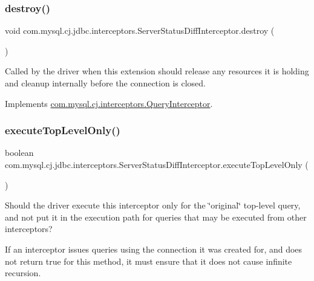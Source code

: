 \subsubsection{\texorpdfstring{destroy()}{destroy()}}
{\footnotesize\ttfamily void com.\+mysql.\+cj.\+jdbc.\+interceptors.\+Server\+Status\+Diff\+Interceptor.\+destroy (\begin{DoxyParamCaption}{ }\end{DoxyParamCaption})}

Called by the driver when this extension should release any resources it is holding and cleanup internally before the connection is closed. 

Implements \mbox{\hyperlink{interfacecom_1_1mysql_1_1cj_1_1interceptors_1_1_query_interceptor_a123809a91800f4f4409f5f37717bf9c8}{com.\+mysql.\+cj.\+interceptors.\+Query\+Interceptor}}.

\mbox{\label{classcom_1_1mysql_1_1cj_1_1jdbc_1_1interceptors_1_1_server_status_diff_interceptor_a3234671cd5949383f563d60003d9798b}} 
\subsubsection{\texorpdfstring{execute\+Top\+Level\+Only()}{executeTopLevelOnly()}}
{\footnotesize\ttfamily boolean com.\+mysql.\+cj.\+jdbc.\+interceptors.\+Server\+Status\+Diff\+Interceptor.\+execute\+Top\+Level\+Only (\begin{DoxyParamCaption}{ }\end{DoxyParamCaption})}

Should the driver execute this interceptor only for the \char`\"{}original\char`\"{} top-\/level query, and not put it in the execution path for queries that may be executed from other interceptors?

If an interceptor issues queries using the connection it was created for, and does not return {\ttfamily true} for this method, it must ensure that it does not cause infinite recursion.


